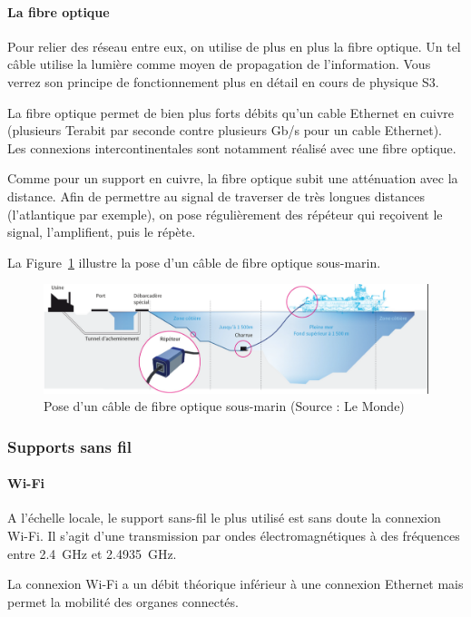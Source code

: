 
\paragraph{La fibre optique}
Pour relier des réseau entre eux, on utilise de plus en plus la fibre optique. Un tel câble utilise la lumière comme moyen de propagation de l'information. Vous verrez son principe de fonctionnement plus en détail en cours de physique S3.

La fibre optique permet de bien plus forts débits qu'un cable Ethernet en cuivre (plusieurs Terabit par seconde contre plusieurs Gb/s pour un cable Ethernet). Les connexions intercontinentales sont notamment réalisé avec une fibre optique.

Comme pour un support en cuivre, la fibre optique subit une atténuation avec la distance. Afin de permettre au signal de traverser de très longues distances (l'atlantique par exemple), on pose régulièrement des répéteur qui reçoivent le signal, l'amplifient, puis le répète.

La Figure~\ref{fig:poseFibre} illustre la pose d'un câble de fibre optique sous-marin.

\begin{figure}[h]
\centering
  \includegraphics[width=.9\textwidth]{../../images/materiel/poseFibrecroped}
  \caption{Pose d'un câble de fibre optique sous-marin (Source : Le Monde)}
  \label{fig:poseFibre}
\end{figure}

\subsubsection{Supports sans fil}
\paragraph{Wi-Fi}
A l'échelle locale, le support sans-fil le plus utilisé est sans doute la connexion Wi-Fi. Il s'agit d'une transmission par ondes électromagnétiques à des fréquences entre \SI{2.4}{GHz} et \SI{2.4935}{GHz}.

La connexion Wi-Fi a un débit théorique inférieur à une connexion Ethernet mais permet la mobilité des organes connectés.

